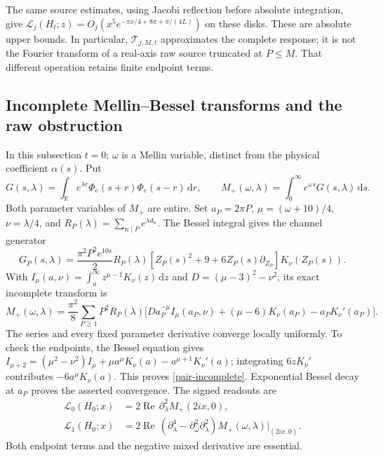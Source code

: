 \documentclass[11pt]{article}
\theoremstyle{definition}
\theoremstyle{remark}
\newcommand{\dd}{\,\mathrm d}
\newcommand{\Rea}{\operatorname{Re}}
\begin{document}
The same source estimates, using Jacobi reflection before absolute
integration, give
$\mathscr L_j(H_t;z)=O_j(x^5e^{-\pi x/4+8\pi+\pi/(4L)})$
on these disks. These are absolute upper bounds.
In particular, $\mathcal T_{j,M,t}$ approximates the complete response;
it is not the Fourier transform of a real-axis raw source truncated
at $P\le M$. That different operation retains finite endpoint terms.

\subsection{Incomplete Mellin--Bessel transforms and the raw obstruction}

In this subsection $t=0$; $\omega$ is a Mellin variable, distinct from
the physical coefficient $\alpha(s)$. Put
\[
 G(s,\lambda)=\int_{\mathbb R}e^{\lambda r}
 \Phi_e(s+r)\Phi_e(s-r)\dd r,\qquad
 M_+(\omega,\lambda)=\int_0^\infty e^{\omega s}G(s,\lambda)\dd s.
\]
Both parameter variables of $M_+$ are entire. Set
$a_P=2\pi P$, $\mu=(\omega+10)/4$, $\nu=\lambda/4$, and
$R_P(\lambda)=\sum_{n\mid P}e^{\lambda d_n}$.
The Bessel integral \cite[10.32.9]{dlmfbessel} gives the channel generator
\[
 G_P(s,\lambda)=\frac{\pi^2P^2e^{10s}}2R_P(\lambda)
 [Z_P(s)^2+9+6Z_P(s)\partial_{Z_P}]K_\nu(Z_P(s)).
\]
With $I_\mu(a,\nu)=\int_a^\infty z^{\mu-1}K_\nu(z)\dd z$ and
$D=(\mu-3)^2-\nu^2$, its exact incomplete transform is
\begin{equation}
 M_+(\omega,\lambda)=\frac{\pi^2}{8}\sum_{P\ge1}P^2R_P(\lambda)
 \big[D a_P^{-\mu}I_\mu(a_P,\nu)
       +(\mu-6)K_\nu(a_P)-a_PK_\nu'(a_P)\big]. \label{pair-incomplete}
\end{equation}
The series and every fixed parameter derivative converge locally
uniformly. To check the endpoints, the Bessel equation gives
$I_{\mu+2}=(\mu^2-\nu^2)I_\mu+\mu a^\mu K_\nu(a)
-a^{\mu+1}K_\nu'(a)$; integrating $6zK_\nu'$ contributes
$-6a^\mu K_\nu(a)$. This proves \eqref{pair-incomplete}.
Exponential Bessel decay at $a_P$ proves the asserted convergence.
The signed readouts are
\begin{align}
 \mathscr L_0(H_0;x)&=2\Rea\,\partial_\lambda^2
 M_+(2ix,0),\nonumber\\
 \mathscr L_1(H_0;x)&=2\Rea\,
 (\partial_\lambda^4-\partial_\omega^2\partial_\lambda^2)
 M_+(\omega,\lambda)\big|_{(2ix,0)}. \label{pair-readouts}
\end{align}
Both endpoint terms and the negative mixed derivative are essential.
\end{document}
